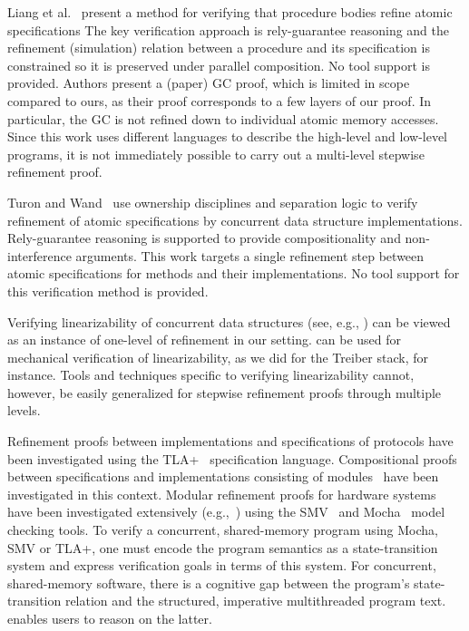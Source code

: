 Liang et al.~\cite{LiangRGSim} present a method for verifying that procedure
bodies refine atomic specifications
The key verification approach is
rely-guarantee reasoning and the refinement (simulation) relation between
a procedure and its specification is constrained so it is preserved under
parallel composition. 
No tool support is provided. 
Authors present a (paper) GC proof, which is limited in scope compared
to ours, as their proof corresponds to a few layers of our proof. In particular,
the GC is not refined down to individual atomic memory accesses. 
Since this work uses different languages to describe the high-level
and low-level programs, it is not immediately possible to carry out a
multi-level stepwise refinement proof. 

Turon and Wand~\cite{TuronM11} use ownership disciplines and
separation logic to verify refinement of atomic specifications by 
concurrent data structure implementations. 
Rely-guarantee reasoning is
supported to provide compositionality and non-interference
arguments. 
This work targets a single refinement step between atomic
specifications for methods and their implementations. 
No tool support for this verification method is provided. 

Verifying linearizability of concurrent data structures (see, e.g.,
\cite{tacasLin,aliLin}) can be viewed as an instance of one-level of
refinement in our setting. 
\civl can be used for mechanical
verification of linearizability, as we did for the Treiber stack, for
instance. 
Tools and techniques specific to verifying linearizability
cannot, however, be easily generalized for stepwise refinement proofs
through multiple levels. 

Refinement proofs
between implementations and specifications of protocols have been
investigated using the TLA+~\cite{Lamport2004} specification
language. 
Compositional proofs between specifications and
implementations consisting of modules~\cite{AbadiAssumeGuarantee} have
been investigated in this context. 
Modular refinement proofs for hardware systems have been investigated extensively
(e.g.,~\cite{Henzinger1999,Eiriksson2000}) using the SMV~\cite{McMillan00} and Mocha~\cite{AlurHMQRT98} 
model checking tools.
To verify a concurrent, shared-memory program using Mocha, SMV or
TLA+, one must encode
the program semantics as a state-transition system and express
verification goals in terms of this system. 
For concurrent, shared-memory
software, there is a cognitive gap between the program's state-transition relation
and the structured, imperative multithreaded program text.
\civl enables users to reason on the latter.
 

